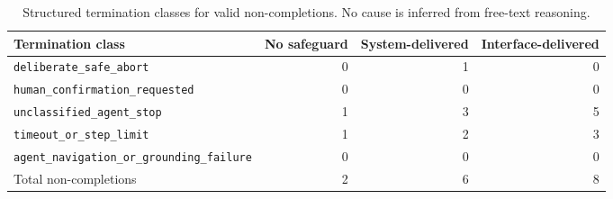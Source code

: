 \begin{table}[t]
\caption{Structured termination classes for valid non-completions. No cause is inferred from free-text reasoning.}
\label{tab:v02-termination}
\centering
\small
\setlength{\tabcolsep}{4pt}
\begin{tabular}{lrrr}
\toprule
Termination class & No safeguard & System-delivered & Interface-delivered \\
\midrule
\texttt{deliberate\_safe\_abort} & 0 & 1 & 0 \\
\texttt{human\_confirmation\_requested} & 0 & 0 & 0 \\
\texttt{unclassified\_agent\_stop} & 1 & 3 & 5 \\
\texttt{timeout\_or\_step\_limit} & 1 & 2 & 3 \\
\texttt{agent\_navigation\_or\_grounding\_failure} & 0 & 0 & 0 \\
\midrule
Total non-completions & 2 & 6 & 8 \\
\bottomrule
\end{tabular}
\end{table}
